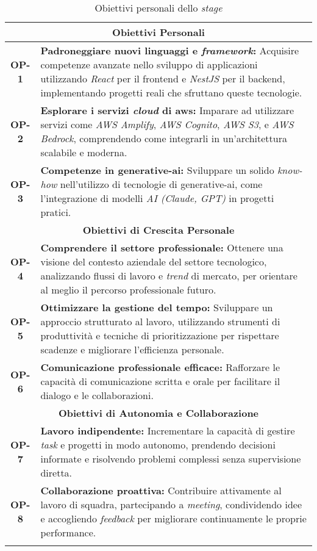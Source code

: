 \begin{longtable}{|c|>{\centering\arraybackslash}p{}|}
    \hline
    \multicolumn{2}{|c|}{\rowcolor{green!30} \textbf{Obiettivi Personali}} \\
    \hline
    \textbf{OP-1} & \textbf{Padroneggiare nuovi linguaggi e \textit{framework}:} Acquisire competenze avanzate nello sviluppo di applicazioni utilizzando \textit{React} per il \gls{frontend} e \textit{NestJS} per il \gls{backend}, implementando progetti reali che sfruttano queste tecnologie. \\
    \hline
    \textbf{OP-2} & \textbf{Esplorare i servizi \textit{cloud} di \gls{aws}:} Imparare ad utilizzare servizi come \textit{AWS Amplify}, \textit{AWS Cognito}, \textit{AWS S3}, e \textit{AWS Bedrock}, comprendendo come integrarli in un’architettura scalabile e moderna. \\
    \hline
    \textbf{OP-3} & \textbf{Competenze in \gls{generative-ai}:} Sviluppare un solido \textit{know-how} nell’utilizzo di tecnologie di \gls{generative-ai}, come l’integrazione di modelli \textit{AI (Claude, GPT)} in progetti pratici. \\
    \hline
    \multicolumn{2}{|c|}{\rowcolor{green!30} \textbf{Obiettivi di Crescita Personale}} \\
    \hline
    \textbf{OP-4} & \textbf{Comprendere il settore professionale:} Ottenere una visione del contesto aziendale del settore tecnologico, analizzando flussi di lavoro e \textit{trend} di mercato, per orientare al meglio il percorso professionale futuro. \\
    \hline
    \textbf{OP-5} & \textbf{Ottimizzare la gestione del tempo:} Sviluppare un approccio strutturato al lavoro, utilizzando strumenti di produttività e tecniche di prioritizzazione per rispettare scadenze e migliorare l’efficienza personale. \\
    \hline
    \textbf{OP-6} & \textbf{Comunicazione professionale efficace:} Rafforzare le capacità di comunicazione scritta e orale per facilitare il dialogo e le collaborazioni. \\
    \hline
    \multicolumn{2}{|c|}{\rowcolor{green!30} \textbf{Obiettivi di Autonomia e Collaborazione}} \\
    \hline
    \textbf{OP-7} & \textbf{Lavoro indipendente:} Incrementare la capacità di gestire \textit{task} e progetti in modo autonomo, prendendo decisioni informate e risolvendo problemi complessi senza supervisione diretta. \\
    \hline
    \textbf{OP-8} & \textbf{Collaborazione proattiva:} Contribuire attivamente al lavoro di squadra, partecipando a \textit{meeting}, condividendo idee e accogliendo \textit{feedback} per migliorare continuamente le proprie performance. \\
    \hline
    \caption{Obiettivi personali dello \textit{stage}} %
    \label{tab:obiettivi-personali-stage} %
\end{longtable}
